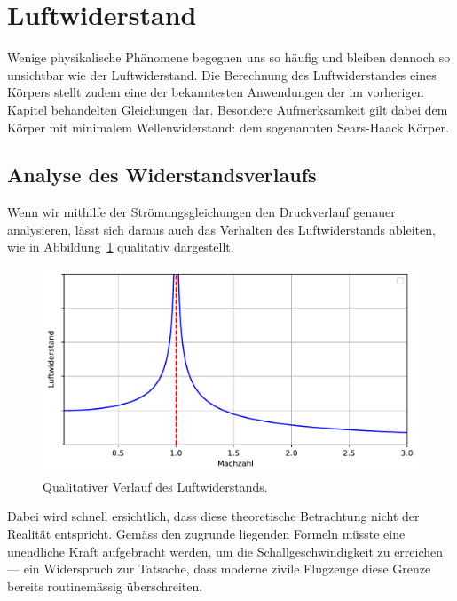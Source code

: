 %
%
%
%
\section{Luftwiderstand\label{ueberschall:section:Luftwiderstand}}
Wenige physikalische Phänomene begegnen uns so häufig 
und bleiben dennoch so unsichtbar wie der Luftwiderstand.
Die Berechnung des Luftwiderstandes eines Körpers 
stellt zudem eine der bekanntesten Anwendungen der 
im vorherigen Kapitel behandelten Gleichungen dar.
Besondere Aufmerksamkeit gilt dabei dem Körper mit 
minimalem Wellenwiderstand: 
dem sogenannten Sears-Haack Körper.

\subsection{Analyse des Widerstandsverlaufs}
Wenn wir mithilfe der Strömungsgleichungen den Druckverlauf genauer analysieren, 
lässt sich daraus auch das Verhalten des Luftwiderstands ableiten, 
wie in Abbildung~\ref{fig:luftwiderstand} qualitativ dargestellt.
\begin{figure}
    \centering
    \includegraphics[width=\textwidth]{papers/ueberschall/figures/Luftwiderstand_qual.pdf}
    \caption{Qualitativer Verlauf des Luftwiderstands.}
    \label{fig:luftwiderstand}
\end{figure}
Dabei wird schnell ersichtlich, dass diese theoretische 
Betrachtung nicht der Realität entspricht.
Gemäss den zugrunde liegenden Formeln müsste eine 
unendliche Kraft aufgebracht werden, 
um die Schallgeschwindigkeit zu erreichen — ein Widerspruch zur Tatsache, 
dass moderne zivile Flugzeuge diese Grenze bereits routinemässig überschreiten.

